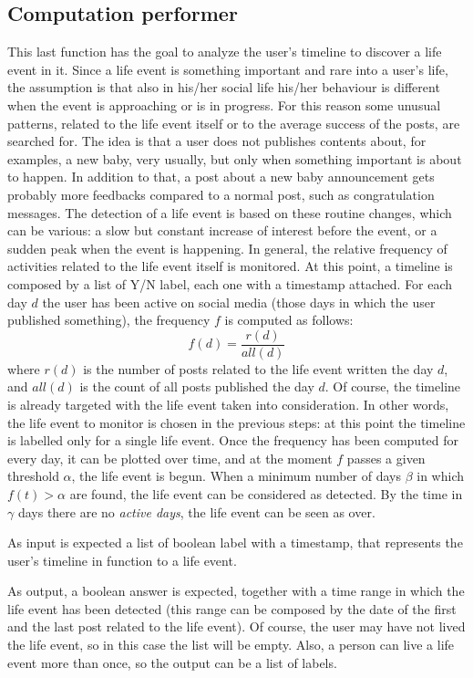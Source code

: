 \subsection{Computation performer}
This last function has the goal to analyze the user's timeline to discover a life event in it. Since a life event is something important and rare into a user's life, the assumption is that also in his/her social life his/her behaviour is different when the event is approaching or is in progress. For this reason some unusual patterns, related to the life event itself or to the average success of the posts, are searched for. The idea is that a user does not publishes contents about, for examples, a new baby, very usually, but only when something important is about to happen. In addition to that, a post about a new baby announcement gets probably more feedbacks compared to a normal post, such as congratulation messages. The detection of a life event is based on these routine changes, which can be various: a slow but constant increase of interest before the event, or a sudden peak when the event is happening. In general, the relative frequency of activities related to the life event itself is monitored.
At this point, a timeline is composed by a list of Y/N label, each one with a timestamp attached. For each day $d$ the user has been active on social media (those days in which the user published something), the frequency $f$ is computed as follows:
\[
f(d) = \frac{r(d)}{all(d)}
\]
where $r(d)$ is the number of posts related to the life event written the day $d$, and $all(d)$ is the count of all posts published the day $d$. Of course, the timeline is already targeted with the life event taken into consideration. In other words, the life event to monitor is chosen in the previous steps: at this point the timeline is labelled only for a single life event. Once the frequency has been computed for every day, it can be plotted over time, and at the moment $f$ passes a given threshold $\alpha$, the life event is begun. When a minimum number of days $\beta$ in which $f(t) > \alpha$ are found, the life event can be considered as detected. By the time in $\gamma$ days there are no \textit{active days}, the life event can be seen as over.

As input is expected a list of boolean label with a timestamp, that represents the user's timeline in function to a life event.

As output, a boolean answer is expected, together with a time range in which the life event has been detected (this range can be composed by the date of the first and the last post related to the life event). Of course, the user may have not lived the life event, so in this case the list will be empty. Also, a person can live a life event more than once, so the output can be a list of labels.


